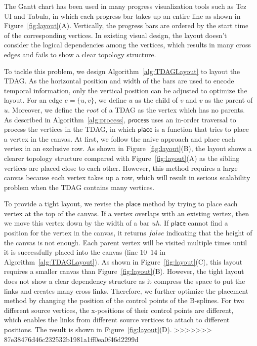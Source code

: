 The Gantt chart has been used in many progress visualization tools such as Tez UI and Tabula, in which each progress bar takes up an entire line as shown in Figure~\ref{fig:layout}(A). Vertically, the progress bars are ordered by the start time of the corresponding vertices. In existing visual design, the layout doesn't consider the logical dependencies among the vertices, which results in many cross edges and fails to show a clear topology structure.


To tackle this problem, we design Algorithm~\ref{alg:TDAGLayout} to layout the TDAG. As the horizontal position and width of the bars are used to encode temporal information, only the vertical position can be adjusted to optimize the layout. For an edge $e=\{u,v\}$, we define $u$ as the child of $v$ and $v$ as the parent of $u$. Moreover, we define the $root$ of a TDAG as the vertex which has no parents. As described in Algorithm~\ref{alg:process}, $\mathsf{process}$ uses an in-order traversal to process the vertices in the TDAG, in which $\mathsf{place}$ is a function that tries to place a vertex in the canvas. At first, we follow the naive approach and place each vertex in an exclusive row. As shown in Figure~\ref{fig:layout}(B), the layout shows a clearer topology structure compared with Figure~\ref{fig:layout}(A) as the sibling vertices are placed close to each other. However, this method requires a large canvas because each vertex takes up a row, which will result in serious scalability problem when the TDAG contains many vertices.  

To provide a tight layout, we revise the $\mathsf{place}$ method by trying to place each vertex at the top of the canvas. If a vertex overlaps with an existing vertex, then we move this vertex down by the width of a bar $uh$. If $\mathsf{place}$ cannot find a position for the vertex in the canvas, it returns $false$ indicating that the height of the canvas is not enough. Each parent vertex will be visited multiple times until it is successfully placed into the canvas (line 10~14 in Algorithm~\ref{alg:TDAGLayout}). As shown in Figure~\ref{fig:layout}(C), this layout requires a smaller canvas than Figure~\ref{fig:layout}(B). However, the tight layout does not show a clear dependency structure as it compress the space to put the links and creates many cross links. Therefore, we further optimize the placement method by  changing the position of the control points of the B-splines. For two different source vertices, the x-positions of their control points are different, which enables the links from different source vertices to attach to different positions. The result is shown in Figure~\ref{fig:layout}(D).
>>>>>>> 87e38476d46c232532b1981a1ff0ea0f46d2299d

